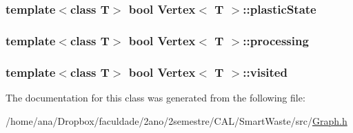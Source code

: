 \subsubsection[{\texorpdfstring{plastic\+State}{plasticState}}]{\setlength{\rightskip}{0pt plus 5cm}template$<$class T$>$ bool {\bf Vertex}$<$ T $>$\+::plastic\+State\hspace{0.3cm}{\ttfamily [private]}}\hypertarget{classVertex_a2eb25055ba8814fbea5d3f782b464a3c}{}\label{classVertex_a2eb25055ba8814fbea5d3f782b464a3c}
\subsubsection[{\texorpdfstring{processing}{processing}}]{\setlength{\rightskip}{0pt plus 5cm}template$<$class T$>$ bool {\bf Vertex}$<$ T $>$\+::processing\hspace{0.3cm}{\ttfamily [private]}}\hypertarget{classVertex_ae575d4b9a6b1ada3f9626c458c060f54}{}\label{classVertex_ae575d4b9a6b1ada3f9626c458c060f54}
\subsubsection[{\texorpdfstring{visited}{visited}}]{\setlength{\rightskip}{0pt plus 5cm}template$<$class T$>$ bool {\bf Vertex}$<$ T $>$\+::visited\hspace{0.3cm}{\ttfamily [private]}}\hypertarget{classVertex_a187a2fe4ff50261cf3c15b8cda7dfc56}{}\label{classVertex_a187a2fe4ff50261cf3c15b8cda7dfc56}


The documentation for this class was generated from the following file\+:\begin{DoxyCompactItemize}
\item 
/home/ana/\+Dropbox/faculdade/2ano/2semestre/\+C\+A\+L/\+Smart\+Waste/src/\hyperlink{Graph_8h}{Graph.\+h}\end{DoxyCompactItemize}
